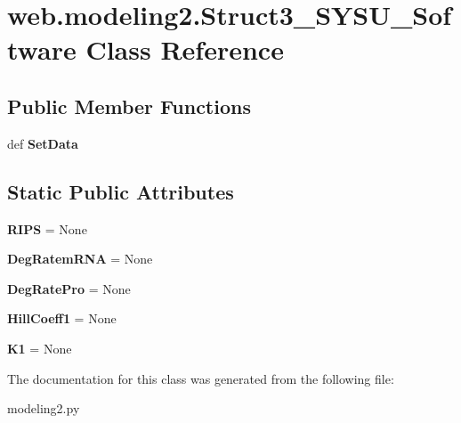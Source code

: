 \hypertarget{classweb_1_1modeling2_1_1_struct3___s_y_s_u___software}{\section{web.\-modeling2.\-Struct3\-\_\-\-S\-Y\-S\-U\-\_\-\-Software Class Reference}
\label{classweb_1_1modeling2_1_1_struct3___s_y_s_u___software}
}
\subsection*{Public Member Functions}
\begin{DoxyCompactItemize}
\item 
\hypertarget{classweb_1_1modeling2_1_1_struct3___s_y_s_u___software_a073dacebb18a0c3dde4246580f3d8582}{def {\bfseries Set\-Data}}\label{classweb_1_1modeling2_1_1_struct3___s_y_s_u___software_a073dacebb18a0c3dde4246580f3d8582}

\end{DoxyCompactItemize}
\subsection*{Static Public Attributes}
\begin{DoxyCompactItemize}
\item 
\hypertarget{classweb_1_1modeling2_1_1_struct3___s_y_s_u___software_a49b40bf0b1f261c85db16ba9a6fa6886}{{\bfseries R\-I\-P\-S} = None}\label{classweb_1_1modeling2_1_1_struct3___s_y_s_u___software_a49b40bf0b1f261c85db16ba9a6fa6886}

\item 
\hypertarget{classweb_1_1modeling2_1_1_struct3___s_y_s_u___software_a979d1fc9b875dc36d1a55ecdbb651b36}{{\bfseries Deg\-Ratem\-R\-N\-A} = None}\label{classweb_1_1modeling2_1_1_struct3___s_y_s_u___software_a979d1fc9b875dc36d1a55ecdbb651b36}

\item 
\hypertarget{classweb_1_1modeling2_1_1_struct3___s_y_s_u___software_af5a786032488c6a4a6381c61e04d1b20}{{\bfseries Deg\-Rate\-Pro} = None}\label{classweb_1_1modeling2_1_1_struct3___s_y_s_u___software_af5a786032488c6a4a6381c61e04d1b20}

\item 
\hypertarget{classweb_1_1modeling2_1_1_struct3___s_y_s_u___software_a77fa680c60912891c6dbd88edc3d7d5f}{{\bfseries Hill\-Coeff1} = None}\label{classweb_1_1modeling2_1_1_struct3___s_y_s_u___software_a77fa680c60912891c6dbd88edc3d7d5f}

\item 
\hypertarget{classweb_1_1modeling2_1_1_struct3___s_y_s_u___software_a859353936f4efcbe3e435714af1a9851}{{\bfseries K1} = None}\label{classweb_1_1modeling2_1_1_struct3___s_y_s_u___software_a859353936f4efcbe3e435714af1a9851}

\end{DoxyCompactItemize}


The documentation for this class was generated from the following file\-:\begin{DoxyCompactItemize}
\item 
modeling2.\-py\end{DoxyCompactItemize}
